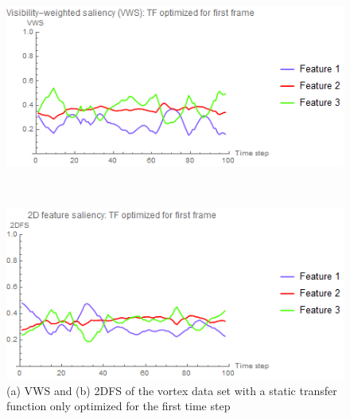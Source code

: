 \begin{figure}
	\centering
	\begin{minipage}{.49\textwidth}
		\includegraphics[width=1\linewidth]{images/vorts_static_VWS}
		\subcaption{}
	\end{minipage}~
	\begin{minipage}{.49\textwidth}
		\includegraphics[width=1\linewidth]{images/vorts_static_2DFS}
		\subcaption{}
	\end{minipage}
	\caption{(a) VWS and (b) 2DFS of the vortex data set with a static transfer function only optimized for the first time step}
	\label{fig:vorts_static}
\end{figure}

